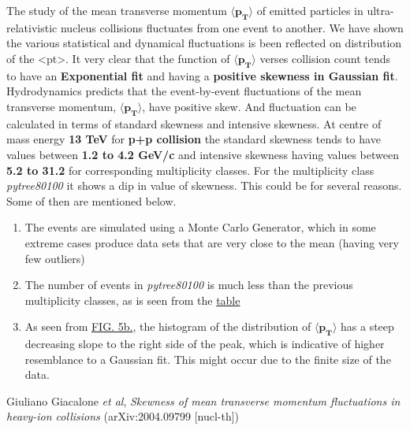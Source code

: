 \documentclass[letterpaper,aps,prc,superscriptaddress,nofootinbib,10pt,showpacs,floatfix]{revtex4-2}%
\begin{document}
The study of the mean transverse momentum $\mathbf{\langle p_T\rangle }$ of emitted particles in ultra-relativistic nucleus collisions fluctuates from one event to another. We have shown the various statistical and dynamical fluctuations is been reflected on distribution of the <pt>. It very clear that the function of $\mathbf{\langle p_T\rangle }$ verses collision count tends to have an \textbf{Exponential fit} and having a \textbf{positive skewness in Gaussian fit}. Hydrodynamics predicts that the event-by-event fluctuations of the mean transverse momentum, $\mathbf{\langle p_T\rangle }$, have positive skew. And fluctuation can be calculated in terms of standard skewness and intensive skewness. At centre of mass energy \textbf{13 TeV} for \textbf{p+p collision} the standard skewness tends to have values between \textbf{1.2 to 4.2 GeV/c} and intensive skewness having values between \textbf{5.2 to 31.2} for corresponding multiplicity classes. For the multiplicity class \textit{pytree80100} it shows a dip in value of skewness. This could be for several reasons. Some of then are mentioned below.
\begin{enumerate}[label=(\roman*)]
\itemsep0em 
\item The events are simulated using a Monte Carlo Generator, which in some extreme cases produce data sets that are very close to the mean (having very few outliers)
\item The number of events in \textit{pytree80100} is much less than the previous multiplicity classes, as is seen from the \hyperref[subsubsec:summary]{table}
\item As seen from \hyperref[Fig:5b]{FIG. 5b.}, the histogram of the distribution of $\mathbf{\langle p_T\rangle }$ has a steep decreasing slope to the right side of the peak, which is indicative of higher resemblance to a Gaussian fit. This might occur due to the finite size of the data. 
\end{enumerate}



\begin{thebibliography}{50}
\medskip


  

  Giuliano Giacalone {\it et al}, \textit{Skewness of mean transverse momentum fluctuations in heavy-ion collisions} (arXiv:2004.09799 [nucl-th])

\end{thebibliography}
\end{document}
